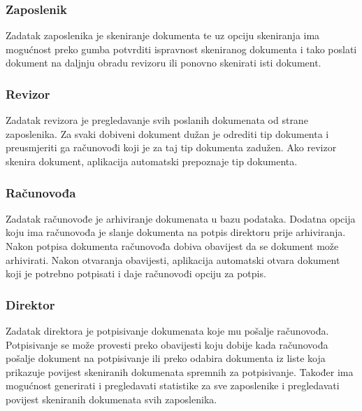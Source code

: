 		\subsubsection{Zaposlenik}
		Zadatak zaposlenika je skeniranje dokumenta te uz opciju skeniranja ima mogućnost preko gumba potvrditi ispravnost skeniranog dokumenta i tako poslati dokument na daljnju obradu revizoru ili ponovno skenirati isti dokument.

		\subsubsection{Revizor}
		Zadatak revizora je pregledavanje svih poslanih dokumenata od strane zaposlenika. Za svaki dobiveni dokument dužan je odrediti tip dokumenta i preusmjeriti ga računovođi koji je za taj tip dokumenta zadužen. Ako revizor skenira dokument, aplikacija automatski prepoznaje tip dokumenta.

		\subsubsection{Računovođa}
		Zadatak računovođe je arhiviranje dokumenata u bazu podataka. Dodatna opcija koju ima računovođa je slanje dokumenta na potpis direktoru prije arhiviranja. Nakon potpisa dokumenta računovođa dobiva obavijest da se dokument može arhivirati. Nakon otvaranja obavijesti, aplikacija automatski otvara dokument koji je potrebno potpisati i daje računovođi opciju za potpis.

		\subsubsection{Direktor}
		Zadatak direktora je potpisivanje dokumenata koje mu pošalje računovođa. Potpisivanje se može provesti preko obavijesti koju dobije kada računovođa pošalje dokument na potpisivanje ili preko odabira dokumenta iz liste koja prikazuje povijest skeniranih dokumenata spremnih za potpisivanje. Također ima mogućnost generirati i pregledavati statistike za sve zaposlenike i pregledavati povijest skeniranih dokumenata svih zaposlenika.
		
